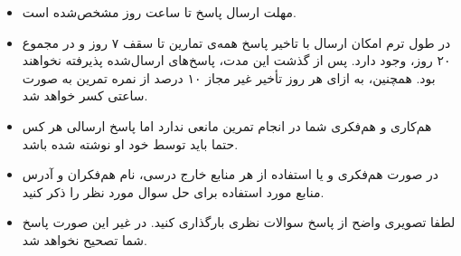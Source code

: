 \begin{itemize}
	\small
	\setlength\itemsep{0.05em}
	\item
	مهلت ارسال پاسخ تا ساعت  روز مشخص‌شده است.
	\item
	در طول ترم امکان ارسال با تاخیر  پاسخ همه‌ی تمارین تا سقف ۷ روز و در مجموع ۲۰ روز، وجود دارد. پس از گذشت این مدت، پاسخ‌های ارسال‌شده پذیرفته نخواهند ‌بود. همچنین، به ازای هر روز تأخیر غیر مجاز ۱۰ درصد از نمره تمرین به صورت ساعتی کسر خواهد شد.
	\item
	هم‌کاری و هم‌فکری شما در انجام تمرین مانعی ندارد اما پاسخ ارسالی هر کس حتما باید توسط خود او نوشته شده‌ باشد. 
	\item
	در صورت هم‌فکری و یا استفاده از هر منابع خارج درسی، نام هم‌فکران و آدرس منابع مورد استفاده ‌برای حل سوال مورد نظر را ذکر‌ کنید.
	\item
	لطفا تصویری واضح از پاسخ سوالات نظری بارگذاری کنید. در غیر این صورت پاسخ شما تصحیح نخواهد شد.
\end{itemize}